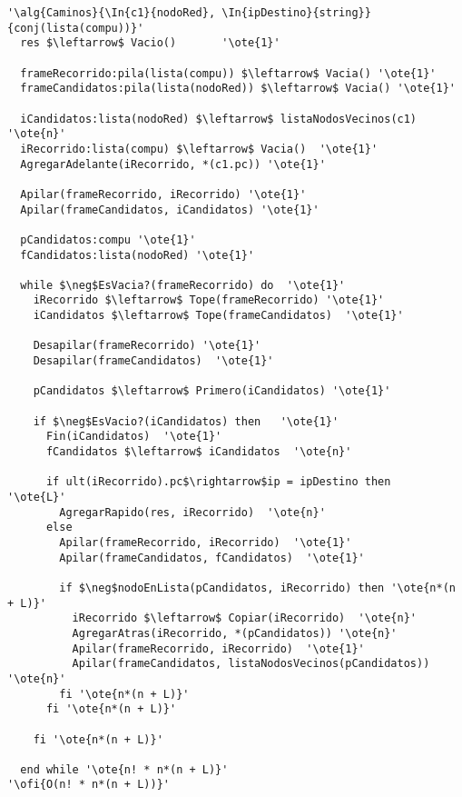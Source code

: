 \begin{lstlisting}[mathescape]
'\alg{Caminos}{\In{c1}{nodoRed}, \In{ipDestino}{string}}{conj(lista(compu))}'
  res $\leftarrow$ Vacio()       '\ote{1}'

  frameRecorrido:pila(lista(compu)) $\leftarrow$ Vacia() '\ote{1}'
  frameCandidatos:pila(lista(nodoRed)) $\leftarrow$ Vacia() '\ote{1}'

  iCandidatos:lista(nodoRed) $\leftarrow$ listaNodosVecinos(c1) '\ote{n}'
  iRecorrido:lista(compu) $\leftarrow$ Vacia()  '\ote{1}'
  AgregarAdelante(iRecorrido, *(c1.pc)) '\ote{1}'

  Apilar(frameRecorrido, iRecorrido) '\ote{1}'
  Apilar(frameCandidatos, iCandidatos) '\ote{1}'

  pCandidatos:compu '\ote{1}'
  fCandidatos:lista(nodoRed) '\ote{1}'

  while $\neg$EsVacia?(frameRecorrido) do  '\ote{1}'
    iRecorrido $\leftarrow$ Tope(frameRecorrido) '\ote{1}'
    iCandidatos $\leftarrow$ Tope(frameCandidatos)  '\ote{1}'

    Desapilar(frameRecorrido) '\ote{1}'
    Desapilar(frameCandidatos)  '\ote{1}'

    pCandidatos $\leftarrow$ Primero(iCandidatos) '\ote{1}'

    if $\neg$EsVacio?(iCandidatos) then   '\ote{1}'
      Fin(iCandidatos)  '\ote{1}'
      fCandidatos $\leftarrow$ iCandidatos  '\ote{n}'

      if ult(iRecorrido).pc$\rightarrow$ip = ipDestino then   '\ote{L}'
        AgregarRapido(res, iRecorrido)  '\ote{n}'
      else
        Apilar(frameRecorrido, iRecorrido)  '\ote{1}'
        Apilar(frameCandidatos, fCandidatos)  '\ote{1}'

        if $\neg$nodoEnLista(pCandidatos, iRecorrido) then '\ote{n*(n + L)}'
          iRecorrido $\leftarrow$ Copiar(iRecorrido)  '\ote{n}'
          AgregarAtras(iRecorrido, *(pCandidatos)) '\ote{n}'
          Apilar(frameRecorrido, iRecorrido)  '\ote{1}'
          Apilar(frameCandidatos, listaNodosVecinos(pCandidatos)) '\ote{n}'
        fi '\ote{n*(n + L)}'
      fi '\ote{n*(n + L)}'

    fi '\ote{n*(n + L)}'

  end while '\ote{n! * n*(n + L)}'
'\ofi{O(n! * n*(n + L))}'
\end{lstlisting}

